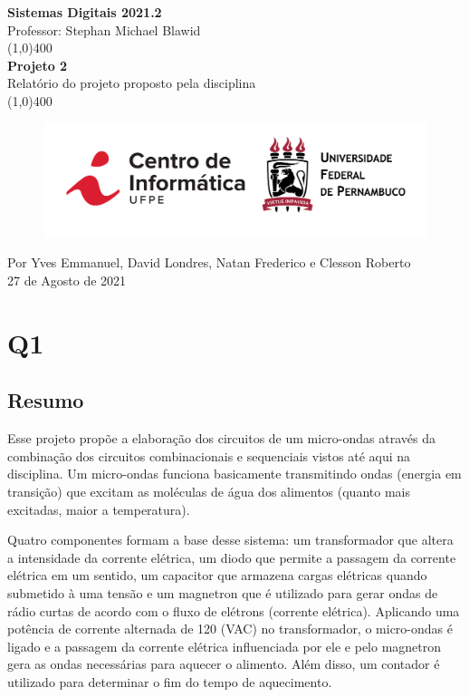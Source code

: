 \documentclass[12pt]{article}
\begin{document}
\begin{titlepage}
\begin{center}
\vspace*{1cm}
\Large{\textbf{Sistemas Digitais 2021.2}\\Professor: Stephan Michael Blawid}\\
\vfill
\line(1,0){400}\\[1mm]
\huge{\textbf{Projeto 2}}\\[3mm]
\Large{Relatório do projeto proposto pela disciplina}\\[1mm]
\line(1,0){400}
\vfill
\begin{figure}[!htb]
    \centering
    \includegraphics[scale=0.2]{imgs/logo cin-ufpe.png}\\
    \label{fig:logo}
\end{figure}
Por Yves Emmanuel, David Londres, Natan Frederico e Clesson Roberto\\27 de Agosto de 2021
\end{center}
\end{titlepage}

\setcounter{page}{1}

\section*{Q1}

\subsection*{Resumo}

Esse projeto propõe a elaboração dos circuitos de um micro-ondas através da combinação dos circuitos combinacionais e sequenciais vistos até aqui na disciplina. Um micro-ondas funciona basicamente transmitindo ondas (energia em transição) que excitam as moléculas de água dos alimentos (quanto mais excitadas, maior a temperatura).


Quatro componentes formam a base desse sistema: um transformador que altera a intensidade da corrente elétrica, um diodo que permite a passagem da corrente elétrica em um sentido, um capacitor que armazena cargas elétricas quando submetido à uma tensão e um magnetron que é utilizado para gerar ondas de rádio curtas de acordo com o fluxo de elétrons (corrente elétrica). Aplicando uma potência de corrente alternada de 120 (VAC) no transformador, o micro-ondas é ligado e a passagem da corrente elétrica influenciada por ele e pelo magnetron gera as ondas necessárias para aquecer o alimento. Além disso, um contador é utilizado para determinar o fim do tempo de aquecimento.
\end{document}
